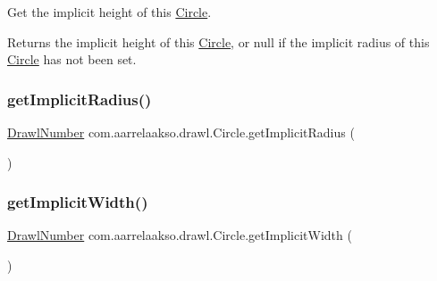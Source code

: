 Get the implicit height of this \hyperlink{classcom_1_1aarrelaakso_1_1drawl_1_1_circle}{Circle}. 

\begin{DoxyReturn}{Returns}
the implicit height of this \hyperlink{classcom_1_1aarrelaakso_1_1drawl_1_1_circle}{Circle}, or {\ttfamily null} if the implicit radius of this \hyperlink{classcom_1_1aarrelaakso_1_1drawl_1_1_circle}{Circle} has not been set. 
\end{DoxyReturn}
\mbox{\label{classcom_1_1aarrelaakso_1_1drawl_1_1_circle_a8538bba4325dbf2c95ab3a597bcb70c6}} 
\subsubsection{\texorpdfstring{get\+Implicit\+Radius()}{getImplicitRadius()}}
{\footnotesize\ttfamily \hyperlink{classcom_1_1aarrelaakso_1_1drawl_1_1_drawl_number}{Drawl\+Number} com.\+aarrelaakso.\+drawl.\+Circle.\+get\+Implicit\+Radius (\begin{DoxyParamCaption}{ }\end{DoxyParamCaption})\hspace{0.3cm}{\ttfamily [protected]}}

\mbox{\label{classcom_1_1aarrelaakso_1_1drawl_1_1_circle_a63c0bcbf1138de1f85041213116c1d3a}} 
\subsubsection{\texorpdfstring{get\+Implicit\+Width()}{getImplicitWidth()}}
{\footnotesize\ttfamily \hyperlink{classcom_1_1aarrelaakso_1_1drawl_1_1_drawl_number}{Drawl\+Number} com.\+aarrelaakso.\+drawl.\+Circle.\+get\+Implicit\+Width (\begin{DoxyParamCaption}{ }\end{DoxyParamCaption})\hspace{0.3cm}{\ttfamily [protected]}}



